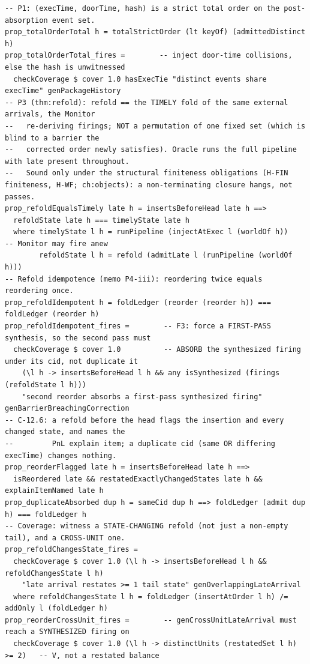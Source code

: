 \documentclass[11pt,a4paper]{article}
\begin{document}
\begin{lstlisting}
-- P1: (execTime, doorTime, hash) is a strict total order on the post-absorption event set.
prop_totalOrderTotal h = totalStrictOrder (lt keyOf) (admittedDistinct h)
prop_totalOrderTotal_fires =        -- inject door-time collisions, else the hash is unwitnessed
  checkCoverage $ cover 1.0 hasExecTie "distinct events share execTime" genPackageHistory
-- P3 (thm:refold): refold == the TIMELY fold of the same external arrivals, the Monitor
--   re-deriving firings; NOT a permutation of one fixed set (which is blind to a barrier the
--   corrected order newly satisfies). Oracle runs the full pipeline with late present throughout.
--   Sound only under the structural finiteness obligations (H-FIN finiteness, H-WF; ch:objects): a non-terminating closure hangs, not passes.
prop_refoldEqualsTimely late h = insertsBeforeHead late h ==>
  refoldState late h === timelyState late h
  where timelyState l h = runPipeline (injectAtExec l (worldOf h))    -- Monitor may fire anew
        refoldState l h = refold (admitLate l (runPipeline (worldOf h)))
-- Refold idempotence (memo P4-iii): reordering twice equals reordering once.
prop_refoldIdempotent h = foldLedger (reorder (reorder h)) === foldLedger (reorder h)
prop_refoldIdempotent_fires =        -- F3: force a FIRST-PASS synthesis, so the second pass must
  checkCoverage $ cover 1.0          -- ABSORB the synthesized firing under its cid, not duplicate it
    (\l h -> insertsBeforeHead l h && any isSynthesized (firings (refoldState l h)))
    "second reorder absorbs a first-pass synthesized firing" genBarrierBreachingCorrection
-- C-12.6: a refold before the head flags the insertion and every changed state, and names the
--         PnL explain item; a duplicate cid (same OR differing execTime) changes nothing.
prop_reorderFlagged late h = insertsBeforeHead late h ==>
  isReordered late && restatedExactlyChangedStates late h && explainItemNamed late h
prop_duplicateAbsorbed dup h = sameCid dup h ==> foldLedger (admit dup h) === foldLedger h
-- Coverage: witness a STATE-CHANGING refold (not just a non-empty tail), and a CROSS-UNIT one.
prop_refoldChangesState_fires =
  checkCoverage $ cover 1.0 (\l h -> insertsBeforeHead l h && refoldChangesState l h)
    "late arrival restates >= 1 tail state" genOverlappingLateArrival
  where refoldChangesState l h = foldLedger (insertAtOrder l h) /= addOnly l (foldLedger h)
prop_reorderCrossUnit_fires =        -- genCrossUnitLateArrival must reach a SYNTHESIZED firing on
  checkCoverage $ cover 1.0 (\l h -> distinctUnits (restatedSet l h) >= 2)   -- V, not a restated balance

\end{lstlisting}
\end{document}
